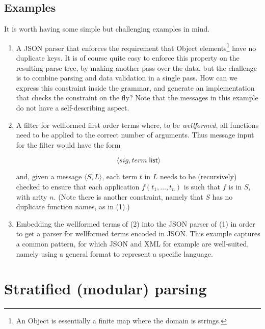 \documentclass{article}
\newcommand{\konst}[1]{\ensuremath{\mathsf{#1}}}
\theoremstyle{definition}
\begin{document}
\subsection{Examples}

It is worth having some simple but challenging examples in mind.

\begin{enumerate}

\item A JSON parser that enforces the requirement that \textsf{Object}
  elements\footnote{An \textsf{Object} is essentially a finite map
    where the domain is strings.} have no duplicate keys. It is of
  course quite easy to enforce this property on the resulting parse
  tree, by making another pass over the data, but the challenge is to
  combine parsing and data validation in a single pass. How can we
  express this constraint inside the grammar, and generate an
  implementation that checks the constraint on the fly? Note that the
  messages in this example do not have a self-describing aspect.

\item A filter for wellformed first order terms where, to be
  \emph{wellformed}, all functions need to be applied to the correct number
  of arguments. Thus message input for the filter would have the form

  \[ \langle \mathit{sig} , \mathit{term}\; \konst{list} \rangle \]

  and, given a message $\langle S, L \rangle$, each term $t$ in $L$
  needs to be (recursively) checked to ensure that each application
  $f(t_1,\ldots,t_n)$ is such that $f$ is in $S$, with arity $n$.
  (Note there is another constraint, namely that $S$ has no duplicate
  function names, as in (1).)

\item Embedding the wellformed terms of (2) into the JSON parser of
  (1) in order to get a parser for wellformed terms encoded in
  JSON. This example captures a common pattern, for which JSON and XML
  for example are well-suited, namely using a general format to
  represent a specific language.

\end{enumerate}


\section{Stratified (modular) parsing}
\end{document}
